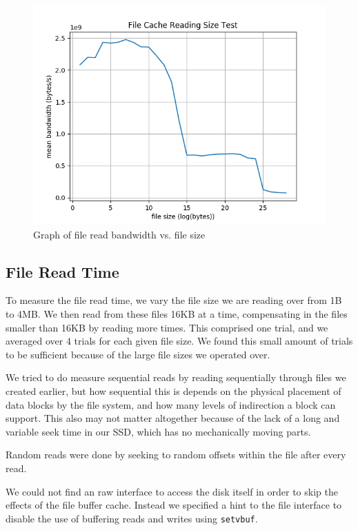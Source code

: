 \documentclass[letterpaper,twocolumn,10pt]{article}
\begin{document}
\begin{figure}
	\centering
	\includegraphics{graphs/file_cache}
  \caption{Graph of file read bandwidth vs. file size}
	\label{fig:filecache}
\end{figure}

\subsection{File Read Time}
To measure the file read time, we vary the file size we are reading over from
1B to 4MB. We then read from these files 16KB at a time, compensating in the
files smaller than 16KB by reading more times. This comprised one trial, and we
averaged over 4 trials for each given file size. We found this small amount of
trials to be sufficient because of the large file sizes we operated over.

We tried to do measure sequential reads by reading sequentially through files
we created earlier, but how sequential this is depends on the physical
placement of data blocks by the file system, and how many levels of indirection
a block can support. This also may not matter altogether because of the lack of
a long and variable seek time in our SSD, which has no mechanically moving
parts.

Random reads were done by seeking to random offsets within the file after every
read. 

We could not find an raw interface to access the disk itself in order to skip
the effects of the file buffer cache. Instead we specified a hint to the file
interface to disable the use of buffering reads and writes using
\texttt{setvbuf}.
\end{document}

